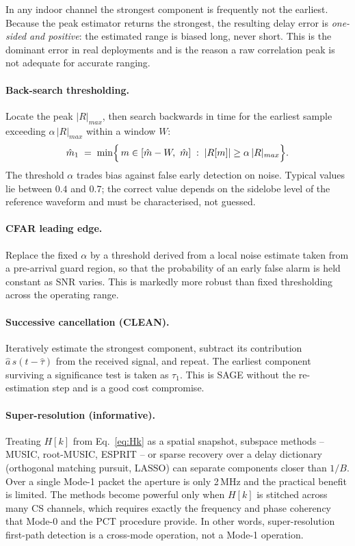 \documentclass[11pt,a4paper]{article}
\begin{document}
In any indoor channel the strongest component is frequently not the earliest. Because the peak
estimator returns the strongest, the resulting delay error is \emph{one-sided and positive}: the
estimated range is biased long, never short. This is the dominant error in real deployments and is
the reason a raw correlation peak is not adequate for accurate ranging.

\paragraph{Back-search thresholding.} Locate the peak $|R|_{max}$, then search backwards in time for
the earliest sample exceeding $\alpha\,|R|_{max}$ within a window $W$:
\begin{equation}
\hat m_1 \;=\; \min\Bigl\{\, m \in [\hat m - W,\ \hat m] \;:\; |R[m]| \ge \alpha\,|R|_{max} \Bigr\}.
\label{eq:jbsf}
\end{equation}
The threshold $\alpha$ trades bias against false early detection on noise. Typical values lie
between $0.4$ and $0.7$; the correct value depends on the sidelobe level of the reference waveform
and must be characterised, not guessed.

\paragraph{CFAR leading edge.} Replace the fixed $\alpha$ by a threshold derived from a local noise
estimate taken from a pre-arrival guard region, so that the probability of an early false alarm is
held constant as SNR varies. This is markedly more robust than fixed thresholding across the
operating range.

\paragraph{Successive cancellation (CLEAN).} Iteratively estimate the strongest component, subtract
its contribution $\hat a\, s(t-\hat\tau)$ from the received signal, and repeat. The earliest
component surviving a significance test is taken as $\tau_1$. This is SAGE without the
re-estimation step and is a good cost compromise.

\paragraph{Super-resolution (informative).} Treating $H[k]$ from Eq.~\eqref{eq:Hk} as a spatial
snapshot, subspace methods -- MUSIC, root-MUSIC, ESPRIT -- or sparse recovery over a delay
dictionary (orthogonal matching pursuit, LASSO) can separate components closer than $1/B$. Over a
single Mode-1 packet the aperture is only 2\,MHz and the practical benefit is limited. The methods
become powerful only when $H[k]$ is stitched across many CS channels, which requires exactly the
frequency and phase coherency that Mode-0 and the PCT procedure provide. In other words,
super-resolution first-path detection is a cross-mode operation, not a Mode-1 operation.
\end{document}
